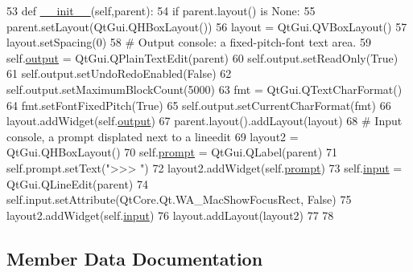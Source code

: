 \begin{DoxyCode}
53     \textcolor{keyword}{def }\hyperlink{classsoftware_1_1chipwhisperer_1_1common_1_1ui_1_1PythonConsole_1_1__QPythonConsoleUI_a24e95cb095e8c779fa050ff9930ed59a}{\_\_init\_\_}(self,parent):
54         \textcolor{keywordflow}{if} parent.layout() \textcolor{keywordflow}{is} \textcolor{keywordtype}{None}:
55             parent.setLayout(QtGui.QHBoxLayout())
56         layout = QtGui.QVBoxLayout()
57         layout.setSpacing(0)
58         \textcolor{comment}{# Output console: a fixed-pitch-font text area.}
59         self.\hyperlink{classsoftware_1_1chipwhisperer_1_1common_1_1ui_1_1PythonConsole_1_1__QPythonConsoleUI_abf915822ac4181722e15c01246bbf4c5}{output} = QtGui.QPlainTextEdit(parent)
60         self.output.setReadOnly(\textcolor{keyword}{True})
61         self.output.setUndoRedoEnabled(\textcolor{keyword}{False})
62         self.output.setMaximumBlockCount(5000)
63         fmt = QtGui.QTextCharFormat()
64         fmt.setFontFixedPitch(\textcolor{keyword}{True})
65         self.output.setCurrentCharFormat(fmt)
66         layout.addWidget(self.\hyperlink{classsoftware_1_1chipwhisperer_1_1common_1_1ui_1_1PythonConsole_1_1__QPythonConsoleUI_abf915822ac4181722e15c01246bbf4c5}{output})
67         parent.layout().addLayout(layout)
68         \textcolor{comment}{# Input console, a prompt displated next to a lineedit}
69         layout2 = QtGui.QHBoxLayout()
70         self.\hyperlink{classsoftware_1_1chipwhisperer_1_1common_1_1ui_1_1PythonConsole_1_1__QPythonConsoleUI_afaaabc93a25a45840aa2a6babcdca2ef}{prompt} = QtGui.QLabel(parent)
71         self.prompt.setText(\textcolor{stringliteral}{">>> "})
72         layout2.addWidget(self.\hyperlink{classsoftware_1_1chipwhisperer_1_1common_1_1ui_1_1PythonConsole_1_1__QPythonConsoleUI_afaaabc93a25a45840aa2a6babcdca2ef}{prompt})
73         self.\hyperlink{classsoftware_1_1chipwhisperer_1_1common_1_1ui_1_1PythonConsole_1_1__QPythonConsoleUI_abf09ccb74a97849113141a1b15daa8e4}{input} = QtGui.QLineEdit(parent)
74         self.input.setAttribute(QtCore.Qt.WA\_MacShowFocusRect, \textcolor{keyword}{False})
75         layout2.addWidget(self.\hyperlink{classsoftware_1_1chipwhisperer_1_1common_1_1ui_1_1PythonConsole_1_1__QPythonConsoleUI_abf09ccb74a97849113141a1b15daa8e4}{input})
76         layout.addLayout(layout2)
77 
78 
\end{DoxyCode}


\subsection{Member Data Documentation}
\hypertarget{classsoftware_1_1chipwhisperer_1_1common_1_1ui_1_1PythonConsole_1_1__QPythonConsoleUI_abf09ccb74a97849113141a1b15daa8e4}{}
